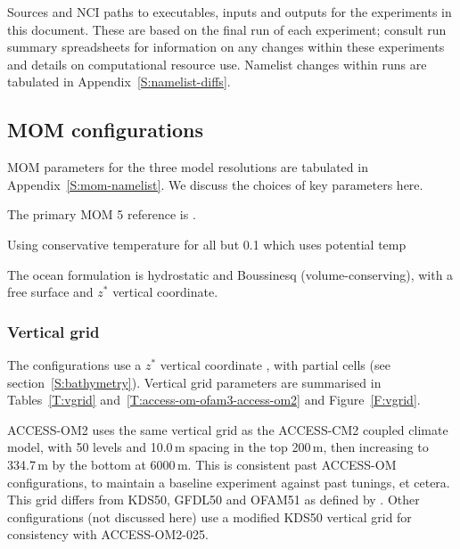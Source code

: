 \documentclass[11pt]{article}
\newcommand{\TODO}[1]{\note{\textcolor{blue}{\textsf{\textbf{TODO: #1}}}}}
\begin{document}
\begin{table}[tbp]
 
\caption{Sources and NCI paths to executables, inputs and outputs for the experiments in this document. 
These are based on the final run of each experiment; consult run summary spreadsheets for information on any changes within these experiments and details on computational resource use. 
Namelist changes within runs are tabulated in Appendix~\ref{S:namelist-diffs}.}\label{T:configs}
\end{table}

\pagebreak
\subsection{MOM configurations}

MOM parameters for the three model resolutions are tabulated in Appendix~\ref{S:mom-namelist}.
We discuss the choices of key parameters here.

The primary MOM 5 reference is \citet{Griffies2012a}.

Using conservative temperature for all but 0.1 which uses potential temp

The ocean formulation is hydrostatic and Boussinesq (volume-conserving), with a free surface and $z^*$ vertical coordinate.



\subsubsection{Vertical grid}

The configurations use a $z^*$ vertical coordinate \citep[][section~5.1.4]{Griffies2012a}, with partial cells (see section~\ref{S:bathymetry}).
Vertical grid parameters are summarised in Tables~\ref{T:vgrid} and~\ref{T:access-om-ofam3-access-om2} and Figure~\ref{F:vgrid}.

ACCESS-OM2 uses the same vertical grid as the ACCESS-CM2 coupled climate model, with 50 levels and 10.0\,m spacing in the top 200\,m, then increasing to 334.7\,m by the bottom at 6000\,m. %
This is consistent past ACCESS-OM configurations, to maintain a baseline experiment against past tunings, et cetera.
This grid differs from KDS50, GFDL50 and OFAM51 as defined by \citet{StewartHoggGriffiesHeerdegenWardSpenceEngland2017a}.
Other configurations (not discussed here) use a modified KDS50 vertical grid for consistency with ACCESS-OM2-025.\TODO{check}
\end{document}

